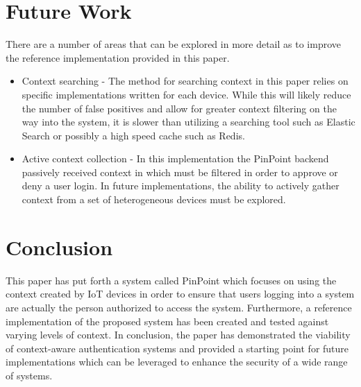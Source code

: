 \documentclass[11pt,journal]{IEEEtran}
\begin{document}
\section{Future Work}
There are a number of areas that can be explored in more detail as to improve the reference implementation provided in this paper.

\begin{itemize}
	\item Context searching - The method for searching context in this paper relies on specific implementations written for each device.  While this will likely reduce the number of false positives and allow for greater context filtering on the way into the system, it is slower than utilizing a searching tool such as Elastic Search or possibly a high speed cache such as Redis.  
	\item Active context collection - In this implementation the PinPoint backend passively received context in which must be filtered in order to approve or deny a user login.  In future implementations, the ability to actively gather context from a set of heterogeneous devices must be explored.
\end{itemize}

\section{Conclusion}

This paper has put forth a system called PinPoint which focuses on using the context created by IoT devices in order to ensure that users logging into a system are actually the person authorized to access the system. Furthermore, a reference implementation of the proposed system has been created and tested against varying levels of context.  In conclusion, the paper has demonstrated the viability of context-aware authentication systems and provided a starting point for future implementations which can be leveraged to enhance the security of a wide range of systems.




\end{document}
